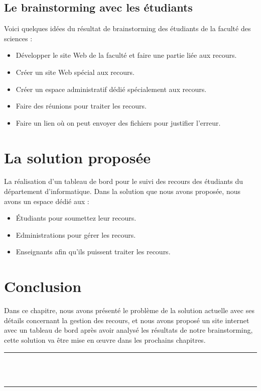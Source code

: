 \documentclass[12pt]{report}
\begin{document}
\subsection{Le brainstorming avec les étudiants}

Voici quelques idées du résultat de brainstorming des étudiants de la faculté des sciences :
\begin{itemize}
    \item Développer le site Web de la faculté et faire une partie liée aux recours.
    \item Créer un site Web spécial aux recours.
    \item Créer un espace administratif dédié spécialement aux recours.
    \item Faire des réunions pour traiter les recours.
    \item Faire un lien où on peut envoyer des fichiers pour justifier l'erreur.
\end{itemize}

\section{La solution proposée}
La réalisation d’un tableau de bord pour le suivi des recours des étudiants du département d’informatique. Dans la solution que nous avons proposée, nous avons un espace dédié aux :
\begin{itemize}
    \item Étudiants pour soumettez leur recours.
    \item Edministrations pour gérer les recours.
    \item Enseignants afin qu’ils puissent traiter les recours.
\end{itemize}

\section{Conclusion}
Dans ce chapitre, nous avons présenté le problème de la solution actuelle avec ses détails concernant la gestion des recours, et nous avons proposé un site internet avec un tableau de bord après avoir analysé les résultats de notre brainstorming, cette solution va être mise en œuvre dans les prochains chapitres.

\newpage

\vspace*{\fill}
\begin{center}
    {\color{Blue} \rule{\linewidth}{1.2mm} }\\
\vspace{0.25in}
    {\centering{}}
\vspace{0.35in}\\
    {\color{Blue} \rule{\linewidth}{1.2mm} }
\end{center}
\vspace*{\fill}
\setcounter{section}{0}
\end{document}
